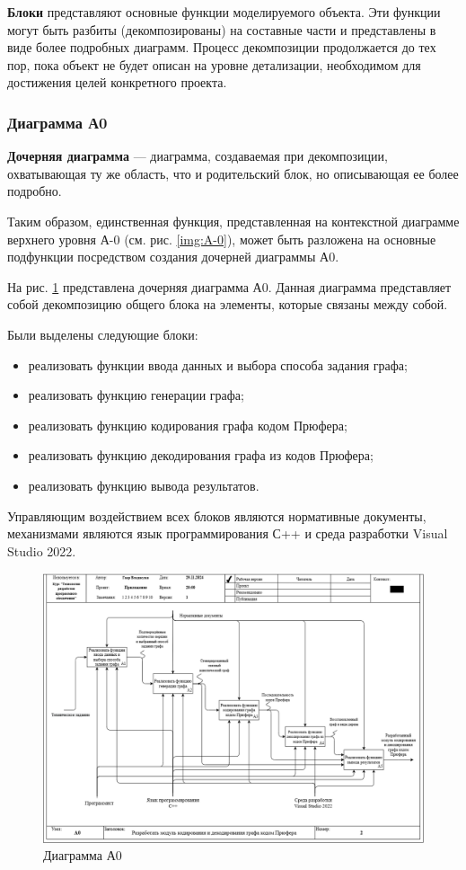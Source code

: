 \documentclass[a4paper, final]{article}
\begin{document}
{\bf Блоки} представляют основные функции моделируемого объекта. Эти функции могут быть разбиты (декомпозированы) 
на составные части и представлены в виде более подробных диаграмм. Процесс декомпозиции продолжается до тех пор, пока 
объект не будет описан на уровне детализации, необходимом для достижения целей конкретного проекта. 

\subsubsection{Диаграмма А0}
{\bf Дочерняя диаграмма} --- диаграмма, создаваемая при декомпозиции, охватывающая ту же область, что и родительский блок, 
но описывающая ее более подробно.

Таким образом, единственная функция, представленная на контекстной диаграмме верхнего уровня А-0 (см. рис. \ref{img:A-0}), 
может быть разложена на основные подфункции посредством создания дочерней диаграммы А0.

На рис. \ref{img:A0} представлена дочерняя диаграмма А0. Данная диаграмма представляет собой декомпозицию общего блока на 
элементы, которые связаны между собой.

Были выделены следующие блоки:

\begin{itemize}
	\item реализовать функции ввода данных и выбора способа задания графа;
	\item реализовать функцию генерации графа;
	\item реализовать функцию кодирования графа кодом Прюфера;
	\item реализовать функцию декодирования графа из кодов Прюфера;
	\item реализовать функцию вывода результатов.
\end{itemize} 

Управляющим воздействием всех блоков являются нормативные документы, механизмами являются язык программирования С++ 
и среда разработки Visual Studio 2022.

\newpage
\begin{figure}[H]
	\centering
	\includegraphics[width=\linewidth]{A0.png}
	\caption{Диаграмма А0}
	\label{img:A0}
\end{figure}
\end{document}
